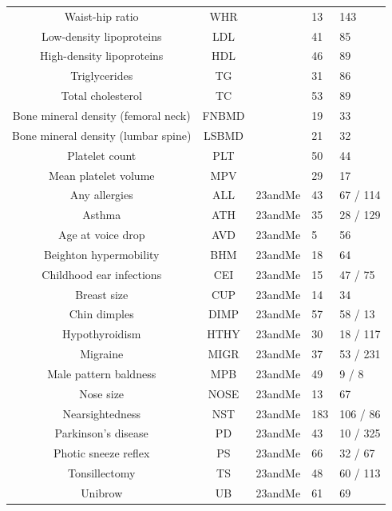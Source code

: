 \documentclass[11pt,titlepage]{article}
\begin{document}
\begin{table}[htdp]
\begin{center}
{\begin{tabular}{|c|c| C{3.5cm}| C{2cm}| C{3cm}| }
Waist-hip ratio & WHR & \citep{Shungin:2015aa}  & 13 & 143 \\ 
Low-density lipoproteins & LDL & \citep{teslovich2010biological} & 41 & 85 \\ 
High-density lipoproteins & HDL & \citep{teslovich2010biological} & 46 & 89\\ 
Triglycerides & TG &\citep{teslovich2010biological} & 31 & 86 \\ 
Total cholesterol & TC & \citep{teslovich2010biological} & 53 & 89 \\ 
Bone mineral density (femoral neck) & FNBMD & \citep{Estrada:2012aa} & 19 & 33\\ 
Bone mineral density (lumbar spine) & LSBMD & \citep{Estrada:2012aa} & 21 & 32\\
Platelet count & PLT &  \citep{gieger2011new} & 50 & 44 \\ 
Mean platelet volume & MPV &  \citep{gieger2011new} & 29 & 17 \\ 
Any allergies & ALL & 23andMe& 43 & 67 / 114 \\ 
Asthma & ATH & 23andMe & 35 & 28 / 129 \\ 
Age at voice drop & AVD & 23andMe & 5 & 56 \\ 
Beighton hypermobility & BHM & 23andMe & 18 & 64\\ 
Childhood ear infections & CEI& 23andMe& 15 & 47 / 75\\ 
Breast size & CUP & 23andMe&14 & 34 \\
Chin dimples & DIMP & 23andMe&57 & 58 / 13\\ 
Hypothyroidism & HTHY& 23andMe &30 & 18 / 117 \\
Migraine & MIGR& 23andMe&37 & 53 / 231 \\ 
Male pattern baldness &MPB& 23andMe&49 & 9 / 8 \\ 
Nose size & NOSE & 23andMe&13 & 67 \\ 
Nearsightedness & NST & 23andMe&183 & 106 / 86\\ 
Parkinson's disease & PD & 23andMe& 43 & 10 / 325 \\ 
Photic sneeze reflex & PS & 23andMe & 66 & 32 / 67\\ 
Tonsillectomy & TS & 23andMe&  48 & 60 / 113\\ 
Unibrow & UB& 23andMe&61 & 69 \\ 
\hline
\end{tabular}
} 
\end{center}
\label{table_phenos}
\end{table}
\end{document}

